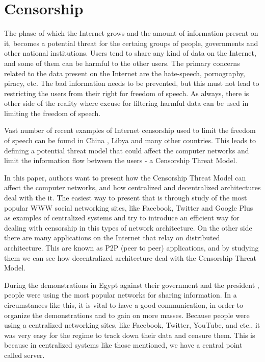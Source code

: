 \section{Censorship}
The phase of which the Internet grows and the amount of information present on it, becomes a potential threat for the certaing groups of people, governments and other national institutions. Users tend to share any kind of data on the Internet, and some of them can be harmful to the other users. The primary concerns related to the data present on the Internet are the hate-speech, pornography, piracy, etc. The bad information needs to be prevented, but this must not lead to restricting the users from their right for freedom of speech. As always, there is other side of the reality where excuse for filtering harmful data can be used in limiting the freedom of speech. 

Vast number of recent examples of Internet censorship used to limit the freedom of speech can be found in China \cite{canaves}, Libya \cite{dianotti2011} and many other countries. 
This leads to defining a potential threat model that could affect the computer networks and limit the information flow between the users - a Censorship Threat Model.

In this paper, authors want to present how the Censorship Threat Model can affect the computer networks, and how centralized and decentralized architectures deal with the it. The easiest way to present that is through study of the most popular WWW social networking sites, like Facebook, Twitter and Google Plus as examples of centralized systems and try to introduce an efficient way for dealing with censorship in this types of network architecture. On the other side there are many applications on the Internet that relay on distributed architecture. This are known as P2P (peer to peer) applications, and by studying them we can see how decentralized architecture deal with the Censorship Threat Model.

During the demonstrations in Egypt against their government and the president \cite{web:scialnetworkcriticalmass}, people were using the most popular networks for sharing information. In a circumstances like this, it is vital to have a good communication, in order to organize the demonstrations and to gain on more masses. 
Because people were using a centralized networking sites, like Facebook, Twitter, YouTube, and etc., it was very easy for the regime to track down their data and censure them. This is because in centralized systems like those mentioned, we have a central point called server. 

